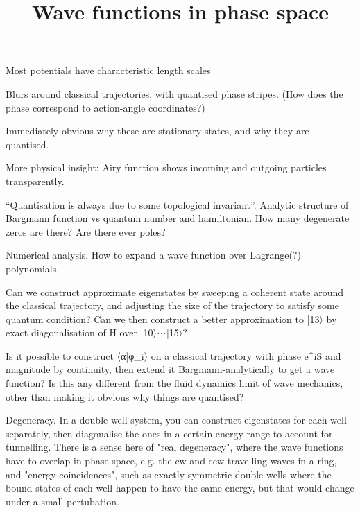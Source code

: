 \title{Wave functions in phase space}



Most potentials have characteristic length scales

Blurs around classical trajectories, with quantised phase stripes.  (How does the phase correspond to action-angle coordinates?)

Immediately obvious why these are stationary states, and why they are quantised.

More physical insight: Airy function shows incoming and outgoing particles transparently.

``Quantisation is always due to some topological invariant''.  Analytic structure of Bargmann function vs quantum number and hamiltonian.  How many degenerate zeros are there?  Are there ever poles?

Numerical analysis.  How to expand a wave function over Lagrange(?) polynomials.

Can we construct approximate eigenstates by sweeping a coherent state around the classical trajectory, and adjusting the size of the trajectory to satisfy some quantum condition?  Can we then construct a better approximation to |13〉 by exact diagonalisation of H over |10〉⋯|15〉?

Is it possible to construct 〈α|φ_i〉 on a classical trajectory with phase e^{iS} and magnitude by continuity, then extend it Bargmann-analytically to get a wave function?  Is this any different from the fluid dynamics limit of wave mechanics, other than making it obvious why things are quantised?

Degeneracy.  In a double well system, you can construct eigenstates for each well separately, then diagonalise the ones in a certain energy range to account for tunnelling.  There is a sense here of "real degeneracy", where the wave functions have to overlap in phase space, e.g. the cw and ccw travelling waves in a ring, and "energy coincidences", such as exactly symmetric double wells where the bound states of each well happen to have the same energy, but that would change under a small pertubation.

